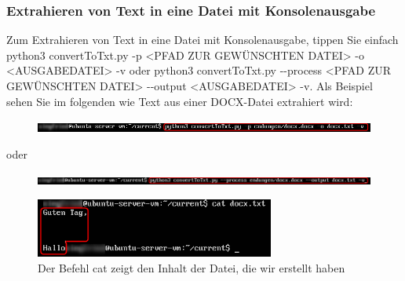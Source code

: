 \documentclass[12pt]{scrartcl}
\begin{document}
\subsubsection{Extrahieren von Text in eine Datei mit Konsolenausgabe}
\label{sec:first-steps-extraction-file-with}
Zum Extrahieren von Text in eine Datei mit Konsolenausgabe, tippen Sie einfach python3 convertToTxt.py -p <PFAD ZUR GEWÜNSCHTEN DATEI> -o <AUSGABEDATEI> -v oder python3 convertToTxt.py -{}-process <PFAD ZUR GEWÜNSCHTEN DATEI> -{}-output <AUSGABEDATEI> -v. Als Beispiel sehen Sie im folgenden wie Text aus einer DOCX-Datei extrahiert wird:
\begin{figure}[htbp]
\includegraphics[width=1.0\textwidth]{ersteSchritteExtractIntoFileWithConsole001}\par\vspace{0.25cm}
\label{fig:ersteSchritteExtractIntoFileWithConsole001}
\end{figure}
\begin{center}
oder
\end{center}
\begin{figure}[htbp]
\includegraphics[width=1.0\textwidth]{ersteSchritteExtractIntoFileWithConsole002}\par

\vspace{0.25cm}
\label{fig:ersteSchritteExtractIntoFileWithConsole002}
\end{figure}
\begin{figure}[htbp]
\centering
\includegraphics[width=0.7\textwidth]{ersteSchritteExtractIntoFileWithoutConsole003}\par\vspace{0.25cm}
\caption{Der Befehl cat zeigt den Inhalt der Datei, die wir erstellt haben}
\end{figure}
\newpage
\end{document}
